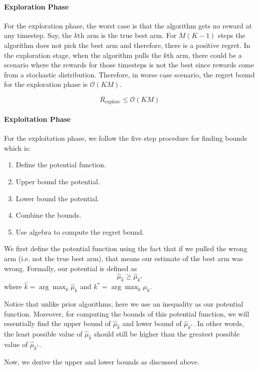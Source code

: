 \documentclass[11pt]{article}
\begin{document}
\paragraph{Exploration Phase}
For the exploration phase, the worst case is that the algorithm gets no reward at any timestep. Say, the $k$th arm is the true best arm. For $M(K-1)$ steps the algorithm does not pick the best arm and therefore, there is a positive regret. In the exploration stage, when the algorithm pulls the $k$th arm, there could be a scenario where the rewards for those timesteps is not the best since rewards come from a stochastic distribution. Therefore, in worse case scenario, the regret bound for the exploration phase is $\mathcal{O}(KM)$.

$$ R_{\text{explore}} \leq \mathcal{O}(KM)$$

\paragraph{Exploitation Phase}
For the exploitation phase, we follow the five step procedure for finding bounds which is:
\begin{enumerate}
    \item Define the potential function.
    \item Upper bound the potential.
    \item Lower bound the potential.
    \item Combine the bounds.
    \item Use algebra to compute the regret bound.
\end{enumerate}
We first define the potential function using the fact
that if we pulled the wrong arm (i.e. not the true best arm), that means
our estimate of the best arm was wrong. Formally, our potential is defined
as
\[
\hat{\mu}_{\hat{k}} \geq \hat{\mu}_{k^*}
\] 
where $\widehat{k} = \arg\max_{k} \widehat{\mu}_k $ and $k^{\ast} = \arg\max_{k} \mu_k$. 

Notice that unlike prior algorithms, here we use an inequality as our potential function. Moreover, for computing the bounds of this potential function, we will essentially find the upper bound of $\hat{\mu}_{\hat{k}}$ and lower bound of $\hat{\mu}_{k^*}$. In other words, the least possible value of $\hat{\mu}_{\hat{k}}$ should still be higher than the greatest possible value of $\hat{\mu}_{k^*}$.

Now, we derive the upper and lower bounds as discussed above.
\end{document}
